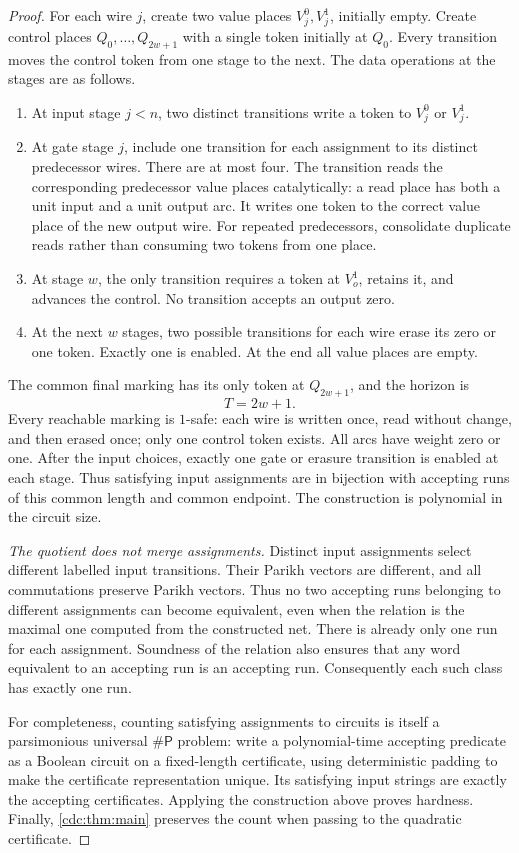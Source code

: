 \documentclass[11pt,a4paper]{article}
\theoremstyle{definition}
\theoremstyle{remark}
\newcommand{\sharpP}{\mathsf{\#P}}
\begin{document}
\begin{proof}
For each wire $j$, create two value places $V_j^0,V_j^1$, initially empty. Create control places $Q_0,\ldots,Q_{2w+1}$ with a single token initially at $Q_0$. Every transition moves the control token from one stage to the next. The data operations at the stages are as follows.
\begin{enumerate}[label=\textup{\arabic*.},leftmargin=2em]
\item At input stage $j<n$, two distinct transitions write a token to $V_j^0$ or $V_j^1$.
\item At gate stage $j$, include one transition for each assignment to its distinct predecessor wires. There are at most four. The transition reads the corresponding predecessor value places catalytically: a read place has both a unit input and a unit output arc. It writes one token to the correct value place of the new output wire. For repeated predecessors, consolidate duplicate reads rather than consuming two tokens from one place.
\item At stage $w$, the only transition requires a token at $V_o^1$, retains it, and advances the control. No transition accepts an output zero.
\item At the next $w$ stages, two possible transitions for each wire erase its zero or one token. Exactly one is enabled. At the end all value places are empty.
\end{enumerate}
The common final marking has its only token at $Q_{2w+1}$, and the horizon is
\[
T=2w+1.
\]
Every reachable marking is $1$-safe: each wire is written once, read without change, and then erased once; only one control token exists. All arcs have weight zero or one. After the input choices, exactly one gate or erasure transition is enabled at each stage. Thus satisfying input assignments are in bijection with accepting runs of this common length and common endpoint. The construction is polynomial in the circuit size.

\emph{The quotient does not merge assignments.} Distinct input assignments select different labelled input transitions. Their Parikh vectors are different, and all commutations preserve Parikh vectors. Thus no two accepting runs belonging to different assignments can become equivalent, even when the relation is the maximal one computed from the constructed net. There is already only one run for each assignment. Soundness of the relation also ensures that any word equivalent to an accepting run is an accepting run. Consequently each such class has exactly one run.

For completeness, counting satisfying assignments to circuits is itself a parsimonious universal $\sharpP$ problem: write a polynomial-time accepting predicate as a Boolean circuit on a fixed-length certificate, using deterministic padding to make the certificate representation unique. Its satisfying input strings are exactly the accepting certificates. Applying the construction above proves hardness. Finally, \cref{cdc:thm:main} preserves the count when passing to the quadratic certificate.
\end{proof}
\end{document}
